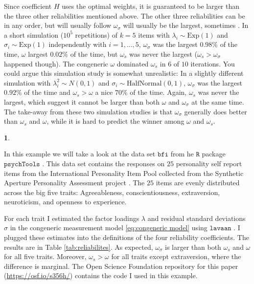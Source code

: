 \documentclass{article}
\theoremstyle{plain}
\theoremstyle{plain}
\theoremstyle{definition}
\theoremstyle{remark}
\theoremstyle{definition}
\newtheorem{example}[thm]{\protect\examplename}
\theoremstyle{plain}
\theoremstyle{plain}
\theoremstyle{definition}
\providecommand{\examplename}{Example}
\begin{document}
Since coefficient $H$ uses the optimal weights, it is guaranteed to
be larger than the three other reliabilities mentioned above. The
other three reliabilities can be in any order, but will usually follow
$\omega_{\sigma}$ will usually be the largest, sometimes . In a short
simulation ($10^{5}$ repetitions) of $k=5$ items with $\lambda_{i}\sim \textrm{Exp}(1)$
and $\sigma_{i}\sim \textrm{Exp}(1)$ independently with $i=1,\ldots,5$, $\omega_{\sigma}$
was the largest $0.98\%$ of the time, $\omega$ largest $0.02\%$
of the time, but $\omega_{s}$ was never the largest ($\omega_{s}>\omega_{\sigma}$
happened though). The congeneric $\omega$ dominated $\omega_{s}$
in $6$ of $10$ iterations. You could argue this simulation study
is somewhat unrealistic: In a slightly different simulation with $\lambda_{i}^{2}\sim N(0,1)$
and $\sigma_{i}\sim \textrm{HalfNormal}(0,1)$, $\omega_{\sigma}$ was the
largest $0.92\%$ of the time and $\omega_{s}>\omega$ a nice $70\%$
of the time. Again, $\omega_{s}$ was never the largest, which suggest
it cannot be larger than both $\omega$ and $\omega_{\sigma}$ at
the same time. The take-away from these two simulation studies is
that $\omega_{\sigma}$ generally does better than $\omega_{s}$ and
$\omega$, while it is hard to predict the winner among $\omega$
and $\omega_{s}$. 

\begin{example}
\label{exa:reliabilities}


In this example we will take a look at the data set $\texttt{bfi}$ from he $\texttt{R}$ \citep{Team2013-tt} package $\texttt{psychTools}$ \citep{Revelle2019-te}. This data set contains the responses on $25$ personality self report items from the International Personality Item Pool \citep{Goldberg1999-iz} collected from the Synthetic Aperture Personality Assessment project \citep{Revelle2016-ez}. The $25$ items are evenly distributed across the big five traits: Agreeableness, conscientiousness, extraversion, neuroticism, and openness to experience. 

For each trait I estimated the factor loadings $\lambda$ and residual standard deviations $\sigma$ in the congeneric measurement model \eqref{eq:congeneric model} using  $\texttt{lavaan}$ \citep{Rosseel2012-yg}. I plugged these estimates into the definitions of the four reliability coefficients. The results are in Table \ref{tab:reliabilites}. As expected, $\omega_\sigma$ is larger than both $\omega_s$ and $\omega$ for all five traits. Moreover, $\omega_s > \omega$ for all traits except extraversion, where the difference is marginal. The Open Science Foundation repository for this paper (\url{https://osf.io/s356h/}) contains the code I used in this example.
\end{example} 
\end{document}
